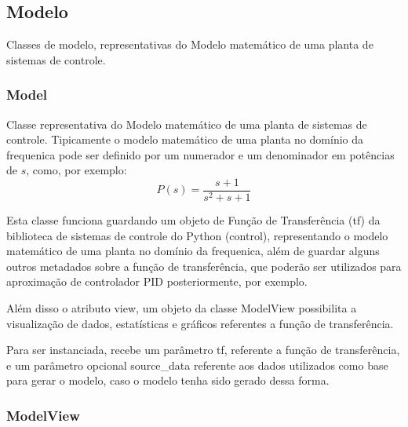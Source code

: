 \subsection{Modelo}

Classes de modelo, representativas do Modelo matemático de uma planta de sistemas de controle.

\subsubsection{Model}

Classe representativa do Modelo matemático de uma planta de sistemas de controle.
Tipicamente o modelo matemático de uma planta no domínio da frequenica pode ser definido por um numerador e um
denominador em potências de $s$, como, por exemplo:
\begin{equation}
    \label{eq:modelex}
    P(s) = \frac{ s + 1 }{ s^2 + s + 1 }
\end{equation}

Esta classe funciona guardando um objeto de Função de Transferência (tf) da biblioteca de sistemas de controle do Python
(control), representando o modelo matemático de uma planta no domínio da frequenica, além de guardar alguns outros
metadados sobre a função de transferência, que poderão ser utilizados para aproximação de controlador PID
posteriormente, por exemplo.

Além disso o atributo view, um objeto da classe ModelView possibilita a visualização de dados, estatísticas e gráficos
referentes a função de transferência.

Para ser instanciada, recebe um parâmetro tf, referente a função de transferência, e um parâmetro opcional source\_data
referente aos dados utilizados como base para gerar o modelo, caso o modelo tenha sido gerado dessa forma.

\subsubsection{ModelView}

